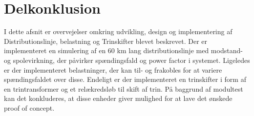 

\section{Delkonklusion}

I dette afsnit er overvejelser omkring udvikling, design og implementering af Distributionslinje, belastning og Trinskifter blevet beskrevet. Der er implementeret en simulering af en 60 km lang distributionslinje med modstand- og spolevirkning, der påvirker spændingsfald og power factor i systemet. Ligeledes er der implementeret belastninger, der kan til- og frakobles for at variere spændingsfaldet over disse. Endeligt er der implementeret en trinskifter i form af en trintransformer og et relækredsløb til skift af trin. På baggrund af modultest kan det konkluderes, at disse enheder giver mulighed for at lave det ønskede proof of concept.

